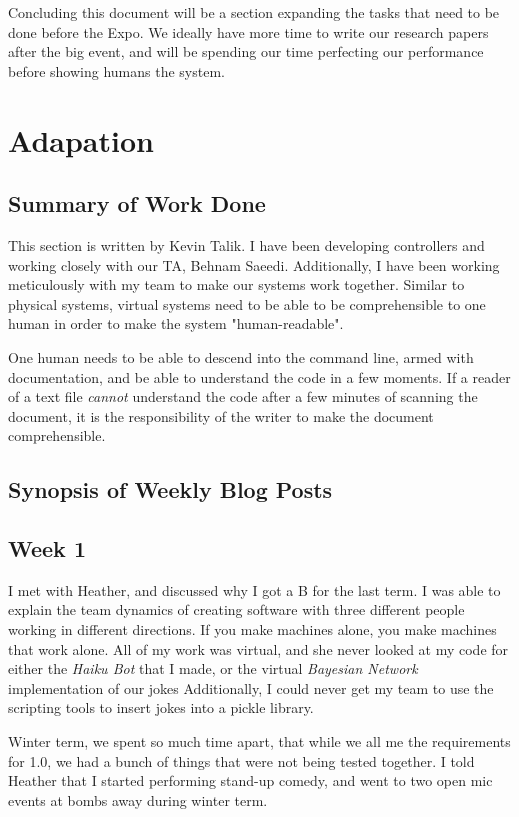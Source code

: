 \documentclass[onecolumn, draftclsnofoot,10pt, compsoc]{IEEEtran}
\begin{document}
Concluding this document will be a section expanding the tasks that need to be done before the Expo. We ideally have more time to write our research papers after the big event, and will be spending our time perfecting our performance before showing humans the system.

\section{Adapation}
\subsection{Summary of Work Done}
 This section is written by Kevin Talik. I have been developing controllers and working closely with our TA, Behnam Saeedi. Additionally, I have been working meticulously with my team to make our systems work together. Similar to physical systems, virtual systems need to be able to be comprehensible to one human in order to make the system "human-readable".

 One human needs to be able to descend into the command line, armed with documentation, and be able to understand the code in a few moments. If a reader of a text file \textit{cannot} understand the code after a few minutes of scanning the document, it is the responsibility of the writer to make the document comprehensible.
 \subsection{Synopsis of Weekly Blog Posts}

 \subsection{Week 1} I met with Heather, and discussed why I got a B for the last term. I was able to explain the team dynamics of creating software with three different people working in different directions. If you make machines alone, you make machines that work alone. All of my work was virtual, and she never looked at my code for either the \textit{Haiku Bot} that I made, or the virtual \textit{Bayesian Network} implementation of our jokes Additionally, I could never get my team to use the scripting tools to insert jokes into a pickle library.

Winter term, we spent so much time apart, that while we all me the requirements for 1.0, we had a bunch of things that were not being tested together. I told Heather that I started performing stand-up comedy, and went to two open mic events at bombs away during winter term.
\end{document}
